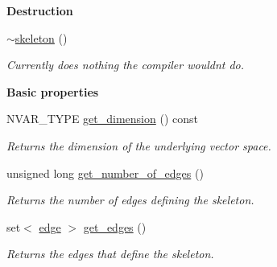 \begin{Indent}\textbf{ Destruction}\par
\begin{DoxyCompactItemize}
\item 
\mbox{\label{classskeleton_ae8874234344e5e51f9b81f6199ee2aa6}} 
\hyperlink{classskeleton_ae8874234344e5e51f9b81f6199ee2aa6}{$\sim$skeleton} ()
\begin{DoxyCompactList}\small\item\em Currently does nothing the compiler wouldn\textquotesingle{}t do. \end{DoxyCompactList}\end{DoxyCompactItemize}
\end{Indent}
\begin{Indent}\textbf{ Basic properties}\par
\begin{DoxyCompactItemize}
\item 
\mbox{\label{classskeleton_ac6dd4f7d7e79ab08d6cf49ad4925f5ef}} 
N\+V\+A\+R\+\_\+\+T\+Y\+PE \hyperlink{classskeleton_ac6dd4f7d7e79ab08d6cf49ad4925f5ef}{get\+\_\+dimension} () const
\begin{DoxyCompactList}\small\item\em Returns the dimension of the underlying vector space. \end{DoxyCompactList}\item 
\mbox{\label{classskeleton_a3e2662e9f9e6a0dde0459dee0b27fd1c}} 
unsigned long \hyperlink{classskeleton_a3e2662e9f9e6a0dde0459dee0b27fd1c}{get\+\_\+number\+\_\+of\+\_\+edges} ()
\begin{DoxyCompactList}\small\item\em Returns the number of edges defining the skeleton. \end{DoxyCompactList}\item 
\mbox{\label{classskeleton_adc4557716509bfeeae99f99b93953cf8}} 
set$<$ \hyperlink{classedge}{edge} $>$ \hyperlink{classskeleton_adc4557716509bfeeae99f99b93953cf8}{get\+\_\+edges} ()
\begin{DoxyCompactList}\small\item\em Returns the edges that define the skeleton. \end{DoxyCompactList}\item 
\mbox{\label{classskeleton_a0b75f0ce54e512673169b193955fc58f}} 

\end{DoxyCompactItemize}
\end{Indent}

